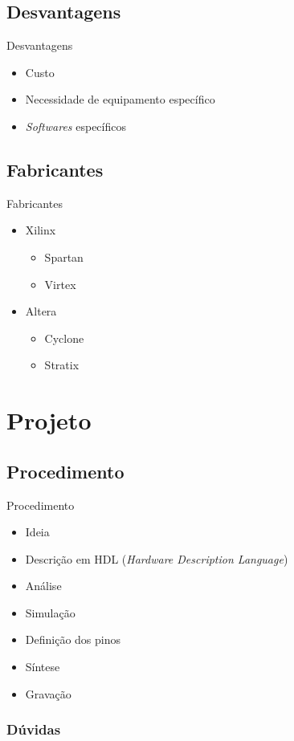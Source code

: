 \subsection{Desvantagens}
\begin{frame}{Desvantagens}
  \begin{itemize}[<+->]
    \item Custo
    \item Necessidade de equipamento específico
    \item \textit{Softwares} específicos
  \end{itemize}
\end{frame}

\subsection{Fabricantes}
\begin{frame}{Fabricantes}
  \begin{itemize}[<+->]
    \item Xilinx
      \begin{itemize}[<+->]
        \item Spartan
        \item Virtex
      \end{itemize}
    \item Altera
      \begin{itemize}[<+->]
        \item Cyclone
        \item Stratix
      \end{itemize}
  \end{itemize}
\end{frame}

\section{Projeto}
\subsection{Procedimento}
\begin{frame}{Procedimento}
  \begin{itemize}[<+->]
    \item Ideia
    \item Descrição em HDL (\textit{Hardware Description Language})
    \item Análise
    \item Simulação
    \item Definição dos pinos
    \item Síntese
    \item Gravação
  \end{itemize}
\end{frame}

\begin{frame}
  \frametitle{Dúvidas}
  \begin{center}
  \end{center}
\end{frame}


